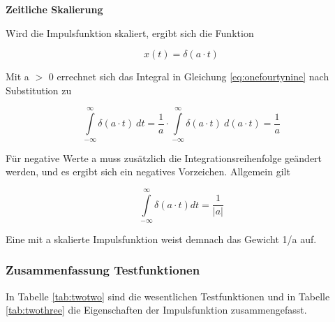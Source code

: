 \bigskip

{\selectfont
\noindent\textbf{Zeitliche Skalierung}} \smallskip

\noindent Wird die Impulsfunktion skaliert, ergibt sich die Funktion

\begin{equation}\label{eq:onefourtynine}
x(t)=\delta (a\cdot t)
\end{equation}


\noindent Mit a $\mathrm{>}$ 0 errechnet sich das Integral in Gleichung \ref{eq:onefourtynine} nach Substitution zu

\begin{equation}\label{eq:fifty}
\int\limits _{-\infty }^{\infty }\delta (a\cdot t) \: dt =\dfrac{1}{a} \cdot \int\limits _{-\infty }^{\infty }\delta (a\cdot t) \: d(a\cdot t) =\dfrac{1}{a}
\end{equation}


\noindent 

\noindent F\"{u}r negative Werte a muss zus\"{a}tzlich die Integrationsreihenfolge ge\"{a}ndert werden, und es ergibt sich ein negatives Vorzeichen. Allgemein gilt 

\begin{equation}\label{eq:onefiftyone}
\int\limits _{-\infty }^{\infty }\delta (a\cdot t) dt =\dfrac{1}{|a|}
\end{equation}


\noindent Eine mit a skalierte Impulsfunktion weist demnach das Gewicht 1/{\textbar}a{\textbar} auf.

\clearpage

\subsubsection{ Zusammenfassung Testfunktionen}

\noindent In Tabelle \ref{tab:twotwo} sind die wesentlichen Testfunktionen und in Tabelle \ref{tab:twothree} die Eigenschaften der Impulsfunktion zusammengefasst.\\


